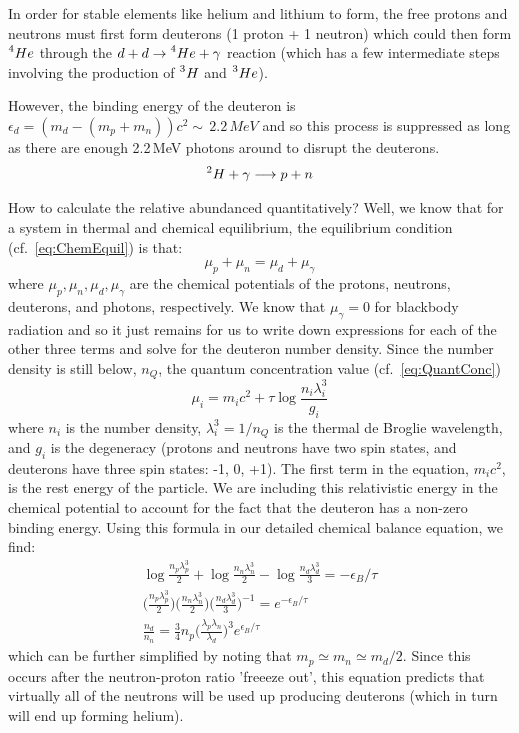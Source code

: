 In order for stable elements like helium and lithium to form, the free protons and neutrons 
must first form deuterons (1 proton + 1 neutron) which could then form $\prescript{4}{}He$ 
through the $d + d \rightarrow \prescript{4}{}He + \gamma$ reaction (which has a few 
intermediate steps involving the production of $\prescript{3}{}H$ and $\prescript{3}{}He$). 

However, the binding energy of the deuteron is $\epsilon_{d} = (m_d - (m_p + m_n))c^2 \sim\,2.2\,MeV$
and so this process is suppressed as long as there are enough 2.2\,MeV photons around to 
disrupt the deuterons.
\begin{align}
\prescript{2}{}H + \gamma \longrightarrow p + n
\end{align}

How to calculate the relative abundanced quantitatively? Well, we know that for a system in thermal and chemical equilibrium, the equilibrium condition (cf.~\cref{eq:ChemEquil}) is that:
\begin{equation}
\mu_p + \mu_n = \mu_d + \mu_{\gamma}
\end{equation}
where $\mu_p, \mu_n, \mu_d, \mu_{\gamma}$ are the chemical potentials of the protons, neutrons, deuterons, and photons, respectively. We know that $\mu_{\gamma} = 0$ for blackbody radiation and so it just remains for us to write down expressions for each of the other three terms and solve for the deuteron number density. Since the number density is still below, $n_Q$, the quantum concentration value (cf.~\cref{eq:QuantConc})
\begin{equation}
\mu_i = m_i c^2 + \tau \log{\frac{n_i \lambda_i^3}{g_i}}
\end{equation}
where $n_i$ is the number density, $\lambda_i^3 = 1/n_Q$ is the thermal de Broglie wavelength, and $g_i$ is the degeneracy (protons and neutrons have two spin states, and deuterons have three spin states: -1, 0, +1). The first term in the equation, $m_i c^2$, is the rest energy of the particle. We are including this relativistic energy in the chemical potential to account for the fact that the deuteron has a non-zero binding energy. Using this formula in our detailed chemical balance equation, we find:
\begin{align}
\log{\frac{n_p \lambda_p^3}{2}} + \log{\frac{n_n \lambda_n^3}{2}} - \log{\frac{n_d \lambda_d^3}{3}} = -\epsilon_B/\tau \\
\bigg(\frac{n_p \lambda_p^3}{2}\bigg)\bigg(\frac{n_n \lambda_n^3}{2}\bigg)\bigg(\frac{n_d \lambda_d^3}{3}\bigg)^{-1} = e^{-\epsilon_B/\tau} \\
\frac{n_d}{n_n} = \frac{3}{4} n_p \bigg(\frac{\lambda_p \lambda_n}{\lambda_d}\bigg)^3 e^{\epsilon_B/\tau}
\end{align}
which can be further simplified by noting that $m_p \simeq m_n \simeq m_d/2$. Since this occurs after the neutron-proton ratio 'freeeze out', this equation predicts that virtually all of the neutrons will be used up producing deuterons (which
in turn will end up forming helium).\\

